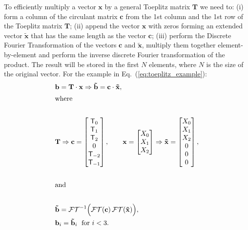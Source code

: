 \documentclass[
pra%
,preprint%
,amssymb, nobibnotes, aps, superscriptaddress, floatfix]{revtex4}
\begin{document}
To efficiently multiply a vector $\mathbf{x}$ by a general Toeplitz matrix $\mathbf{T}$ we need to: (i) form a column of the circulant matrix $\mathbf{c}$ from the 1st column and the 1st row of the Toeplitz matrix $\mathbf{T}$; (ii) append the vector $\mathbf{x}$ with zeros forming an extended vector $\mathbf{\tilde{x}}$ that has the same length as the vector $\mathbf{c}$; (iii) perform the Discrete Fourier Transformation of the vectors $\mathbf{c}$ and $\mathbf{\tilde{x}}$, multiply them together element-by-element and perform the inverse discrete Fourier transformation of the product. The result will be stored in the first $N$ elements, where $N$ is the size of the original vector. For the example in Eq.~(\ref{eq:toeplitz_example}):
\begin{align}
&\mathbf{b} = \mathbf{T} \cdot \mathbf{x} \Rightarrow 
\mathbf{\tilde{b}} = \mathbf{c} \cdot \mathbf{\tilde{x}}, \nonumber \\
\intertext{where} \nonumber\\
&\mathbf{T} \Rightarrow
\mathbf{c} = 
\begin{bmatrix}
\mathsf{T}_{0} \\
\mathsf{T}_{1} \\
\mathsf{T}_{2} \\
0 \\
\mathsf{T}_{-2} \\
\mathsf{T}_{-1}
\end{bmatrix},
\hspace{20pt}
\mathbf{x}=
\begin{bmatrix}
X_{0} \\
X_{1} \\
X_{2}
\end{bmatrix}
\Rightarrow
\mathbf{\tilde{x}}=
\begin{bmatrix}
X_{0} \\
X_{1} \\
X_{2} \\
0 \\
0 \\
0 \\
\end{bmatrix}, \nonumber \\ \nonumber \\
\intertext{and} \nonumber\\
&\mathbf{\tilde{b}} =  \mathcal{FT}^{-1}\Big(  \mathcal{FT}(\mathbf{c}) \, \mathcal{FT}(\mathbf{\tilde{x}}) \Big), \nonumber \\
&\mathbf{b}_i = \mathbf{\tilde{b}}_i \; \text{ for } i < 3.
\end{align}
\end{document}

